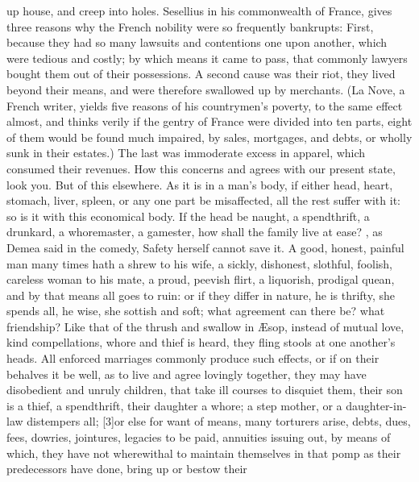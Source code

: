 {up house, and creep into holes. Sesellius in his commonwealth of
France, gives three reasons why the French nobility were so
frequently bankrupts: First, because they had so many lawsuits and
contentions one upon another, which were tedious and costly; by which
means it came to pass, that commonly lawyers bought them out of their
possessions. A second cause was their riot, they lived beyond their
means, and were therefore swallowed up by merchants. (La Nove, a French
writer, yields five reasons of his countrymen's poverty, to the same
effect almost, and thinks verily if the gentry of France were divided
into ten parts, eight of them would be found much impaired, by sales,
mortgages, and debts, or wholly sunk in their estates.) The last was
immoderate excess in apparel, which consumed their revenues. How this
concerns and agrees with our present state, look you. But of this
elsewhere. As it is in a man's body, if either head, heart, stomach,
liver, spleen, or any one part be misaffected, all the rest suffer with
it: so is it with this economical body. If the head be naught, a
spendthrift, a drunkard, a whoremaster, a gamester, how shall the
family live at ease? , as Demea said in the comedy, Safety herself
cannot save it. A good, honest, painful man many times hath a shrew to
his wife, a sickly, dishonest, slothful, foolish, careless woman to his
mate, a proud, peevish flirt, a liquorish, prodigal quean, and by that
means all goes to ruin: or if they differ in nature, he is thrifty, she
spends all, he wise, she sottish and soft; what agreement can there be?
what friendship? Like that of the thrush and swallow in \AE{}sop, instead
of mutual love, kind compellations, whore and thief is heard, they
fling stools at one another's heads.  All enforced marriages commonly produce such effects, or if
on their behalves it be well, as to live and agree lovingly together,
they may have disobedient and unruly children, that take ill courses to
disquiet them, their son is a thief, a spendthrift, their daughter
a whore; a step mother, or a daughter-in-law distempers all;
[3\baselineskip]or else for want of means, many torturers arise, debts, dues,
fees, dowries, jointures, legacies to be paid, annuities issuing out,
by means of which, they have not wherewithal to maintain themselves in
that pomp as their predecessors have done, bring up or bestow their
}
